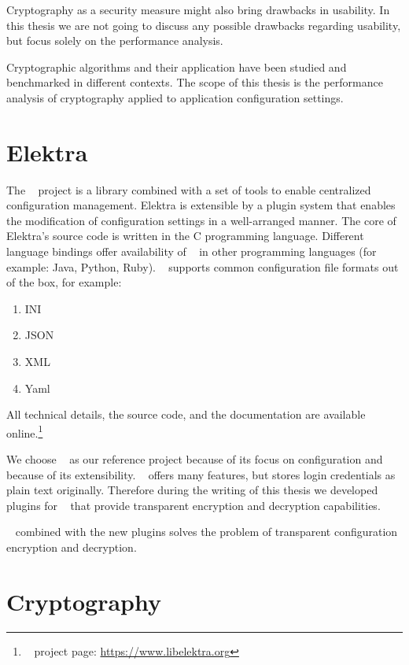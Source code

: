 
Cryptography as a security measure might also bring drawbacks in usability.
In this thesis we are not going to discuss any possible drawbacks regarding usability, but focus solely on the performance analysis.

Cryptographic algorithms and their application have been studied and benchmarked in different contexts.\cite{ocf,freebsdtls,thakur2011aes}
The scope of this thesis is the performance analysis of cryptography applied to application configuration settings.

\section{Elektra}

The \elektra~ project is a library combined with a set of tools to enable centralized configuration management.
Elektra is extensible by a plugin system that enables the modification of configuration settings in a well-arranged manner.
The core of Elektra's source code is written in the C programming language.
Different language bindings offer availability of \elektra~ in other programming languages (for example: Java, Python, Ruby).
\elektra~ supports common configuration file formats out of the box, for example:\cite{elektra-doc,raab2010thesis}
\begin{enumerate}
\item INI
\item JSON
\item XML
\item Yaml
\end{enumerate}

All technical details, the source code, and the documentation are available online.\footnote{\elektra~ project page: \url{https://www.libelektra.org}}

We choose \elektra~ as our reference project because of its focus on configuration and because of its extensibility.
\elektra~ offers many features, but stores login credentials as plain text originally.
Therefore during the writing of this thesis we developed plugins for \elektra~ that provide transparent encryption and decryption capabilities.

\elektra~ combined with the new plugins solves the problem of transparent configuration encryption and decryption.

\section{Cryptography}

